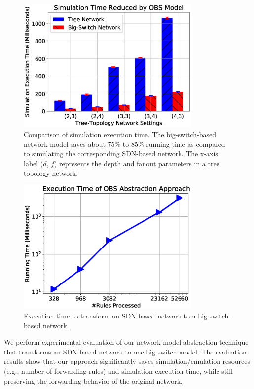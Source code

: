 \begin{figure}[t]
    \centering
    \includegraphics[width=0.8\textwidth]{OneBigSwitch/figures/comp_sim_time.eps}
    \caption[Comparison of Simulation Execution Time]{Comparison of simulation execution time.
        The big-switch-based network model saves about 75\% to 85\% running time
        as compared to simulating the corresponding SDN-based network.
        The x-axis label ($d$, $f$) represents the depth and fanout parameters in a tree topology network.}
    \label{OBS:Fig:CompareSimulationTime}
\end{figure}

\begin{figure}[t]
    \centering
    \includegraphics[width=0.8\textwidth]{OneBigSwitch/figures/bs_overhead.eps}
    \caption[Execution Time of One-Big-Switch Abstraction]{Execution time to transform an SDN-based network to a big-switch-based network.}
    \label{OBS:Fig:BSOverhead}
\end{figure}

\label{OBS:SubSec:PreserveForwardingLogic}
We perform experimental evaluation of our network model abstraction technique
that transforms an SDN-based network to one-big-switch model.
The evaluation results show that our approach significantly saves simulation/emulation resources
(e.g., number of forwarding rules) and simulation execution time,
while still preserving the forwarding behavior of the original network.

